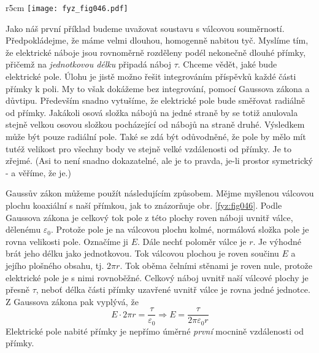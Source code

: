 {  \begin{wrapfigure}[12]{r}{5cm}  %
    \centering
    \texttt{[image: fyz\_fig046.pdf]}
    \caption{Válcová gaussovská plocha s nabitou přímkou v ose}
    \label{fyz:fig046}
  \end{wrapfigure}
  Jako náš první příklad budeme uvažovat soustavu s válcovou souměrností. Předpokládejme, že 
  máme velmi dlouhou, homogenně nabitou tyč. Myslíme tím, že elektrické náboje jsou rovnoměrně 
  rozděleny podél nekonečně dlouhé přímky, přičemž na \emph{jednotkovou délku} připadá náboj 
  \(\tau\). Chceme vědět, jaké bude elektrické pole. Úlohu je jistě možno řešit integrováním 
  příspěvků každé části přímky k poli. My to však dokážeme bez integrování, pomocí Gaussova 
  zákona a důvtipu. Především snadno vytušíme, že elektrické pole bude směřovat radiálně od 
  přímky. Jakákoli osová složka nábojů na jedné straně by se totiž anulovala stejně velkou 
  osovou složkou pocházející od nábojů na straně druhé. Výsledkem může být pouze radiální pole. 
  Také se zdá být odůvodněné, že pole by mělo mít tutéž velikost pro všechny body ve stejně 
  velké vzdálenosti od přímky. Je to zřejmé. (Asi to není snadno dokazatelné, ale je to pravda, 
  je-li prostor symetrický - a věříme, že je.)
  
  Gaussův zákon můžeme použít následujícím způsobem. Mějme myšlenou válcovou plochu koaxiální s 
  naší přímkou, jak to znázorňuje obr. \ref{fyz:fig046}. Podle Gaussova zákona 
  je celkový tok pole z této plochy roven náboji uvnitř válce, dělenému \(\varepsilon_0\). 
  Protože pole je na válcovou plochu kolmé, normálová složka pole je rovna velikosti pole. 
  Označíme ji \(E\). Dále nechť poloměr válce je \(r\). Je výhodné brát jeho délku jako 
  jednotkovou. Tok válcovou plochou je roven součinu \(E\) a jejího plošného obsahu, tj. \(2\pi 
  r\). Tok oběma čelními stěnami je roven nule, protože elektrické pole je s nimi rovnoběžné. 
  Celkový náboj uvnitř naší válcové plochy je přesně \(\tau\), neboť délka části přímky 
  uzavřené uvnitř válce je rovna jedné jednotce. Z Gaussova zákona pak vyplývá, že
  \begin{equation}\label{fyz:eq_fey_elstat_gauss02}
    E\cdot2\pi r = \frac{\tau}{\varepsilon_0} \Rightarrow E = \frac{\tau}{2\pi\varepsilon_0 r}
  \end{equation}
  Elektrické pole nabité přímky je nepřímo úměrné \emph{první} mocnině vzdálenosti od přímky.
  
     

}
